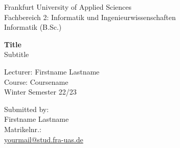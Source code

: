 \begin{titlepage}
\begin{flushleft}
Frankfurt University of Applied Sciences\\
Fachbereich 2: Informatik und Ingenieurwissenschaften\\
Informatik (B.Sc.)\\
\end{flushleft}

\vspace{3.5cm}

\begin{center}
\Large
\textbf{Title}\\
\vspace{0.3cm}
\large
Subtitle
\end{center}

\vspace{9.8cm}
	
\begin{flushright}
Lecturer: Firstname Lastname\\
Course: Coursename\\
Winter Semester 22/23\\
\end{flushright}

\vspace{2cm}

\begin{flushleft}
Submitted by:\\
Firstname Lastname\\
Matrikelnr.:\\
\href{mailto: yourmail@stud.fra-uas.de}{yourmail@stud.fra-uas.de}\\
\end{flushleft}

\end{titlepage}